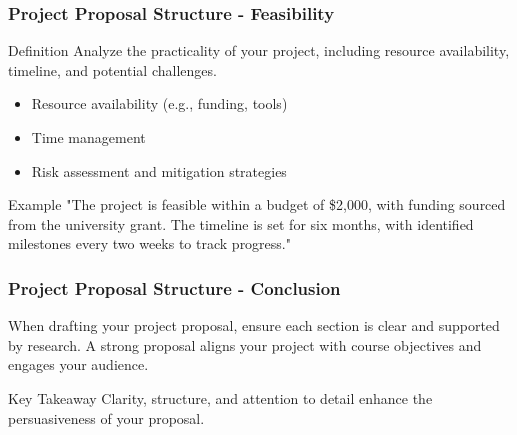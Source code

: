 \documentclass[aspectratio=169]{beamer}
\begin{document}
\begin{frame}[fragile]
    \frametitle{Project Proposal Structure - Feasibility}
    \begin{block}{Definition}
        Analyze the practicality of your project, including resource availability, timeline, and potential challenges.
    \end{block}
    
    \begin{itemize}
        \item Resource availability (e.g., funding, tools)
        \item Time management
        \item Risk assessment and mitigation strategies
    \end{itemize}
    
    \begin{block}{Example}
        "The project is feasible within a budget of \$2,000, with funding sourced from the university grant.
        The timeline is set for six months, with identified milestones every two weeks to track progress."
    \end{block}
\end{frame}

\begin{frame}[fragile]
    \frametitle{Project Proposal Structure - Conclusion}
    When drafting your project proposal, ensure each section is clear and supported by research. 
    A strong proposal aligns your project with course objectives and engages your audience.
    
    \begin{block}{Key Takeaway}
        Clarity, structure, and attention to detail enhance the persuasiveness of your proposal.
    \end{block}
\end{frame}
\end{document}
